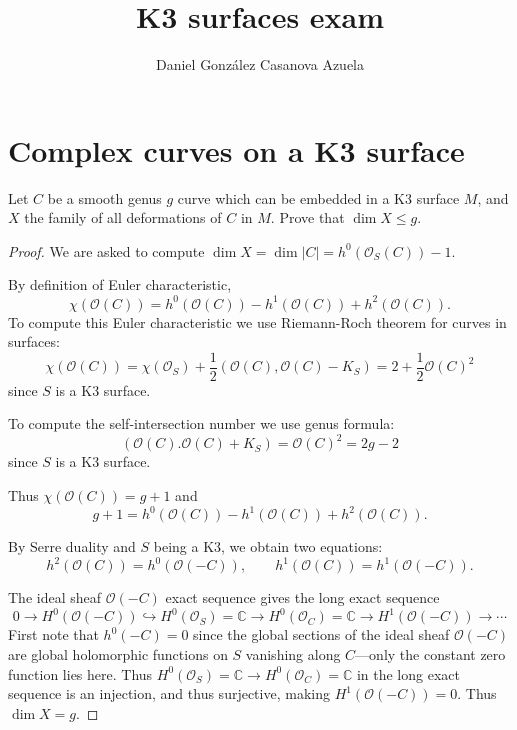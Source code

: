 



\title{K3 surfaces exam}
\author{Daniel González Casanova Azuela}
\maketitle

\section*{Complex curves on a K3 surface}
\label{section-curves}

\begin{exercise}[2.6a]
\label{exercise-deformations-curve-in-k3}
Let $C$ be a smooth genus $g$ curve which
can be embedded in a K3 surface $M$, and
$X$
the family of all deformations of $C$ in
$M$.
Prove that $\dim X \leq g$.
\end{exercise}

\begin{proof}
We are asked to compute
$\dim X = \dim|C|=h^0(\mathcal{O}_S(C))-1$.

By definition of Euler characteristic,
$$
\chi(\mathcal{O}(C))
=
h^0(\mathcal{O}(C))
- h^1(\mathcal{O}(C))
+ h^2(\mathcal{O}(C)).
$$
To compute this Euler characteristic we use
Riemann-Roch theorem for curves in surfaces:
$$
\chi(\mathcal{O}(C))
=
\chi(\mathcal{O}_S)
+\frac{1}{2}(\mathcal{O}(C),\mathcal{O}(C)-K_S)
=
2+\frac{1}{2}\mathcal{O}(C)^2
$$
since $S$ is a K3 surface.

To compute the self-intersection number
we use genus formula:
$$
(\mathcal{O}(C).\mathcal{O}(C)+K_S)
=
\mathcal{O}(C)^2
=
2g-2
$$
since $S$ is a K3 surface.

Thus $\chi(\mathcal{O}(C))=g+1$ and
$$
g+1=h^0(\mathcal{O}(C))
-h^1(\mathcal{O}(C))
+h^2(\mathcal{O}(C)).
$$

By Serre duality and $S$ being a K3,
we obtain two equations:
$$
h^2(\mathcal{O}(C))
=
h^0(\mathcal{O}(-C)),
\qquad 
h^1(\mathcal{O}(C))
=
h^1(\mathcal{O}(-C)).
$$

The ideal sheaf $\mathcal{O}(-C)$
exact sequence gives
the long exact sequence
$$
0 \to H^0(\mathcal{O}(-C))
\hookrightarrow
H^0(\mathcal{O}_S)=\mathbb{C}
\to
H^0(\mathcal{O}_C)=\mathbb{C}
\to 
H^1(\mathcal{O}(-C))
\to
\cdots
$$
First note that
$h^0(-C) = 0$
since the global sections of the
ideal sheaf $\mathcal{O}(-C)$
are global holomorphic functions on $S$
vanishing along $C$---only the
constant zero function lies here.
Thus
$H^0(\mathcal{O}_S) =\mathbb{C}
\to
H^0(\mathcal{O}_C)=\mathbb{C}$
in the long exact sequence is an injection,
and thus surjective, making
$H^1(\mathcal{O}(-C))=0$.
Thus $\dim X = g$.
\end{proof}

